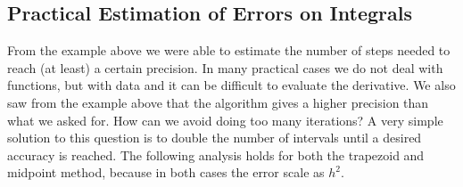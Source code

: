 \documentclass[graybox,sectrefs,envcountresetchap,open=right,final]{svmonodo}
\begin{document}
\subsection{Practical Estimation of Errors on Integrals}
\label{sec:numint:parct}
From the example above we were able to estimate the number of steps needed to reach (at least) a certain precision. 
In many practical cases we do not deal with functions, but with data and it can be difficult to evaluate the derivative. 
We also saw from the example above that the algorithm gives a higher precision than what we asked for. 
How can we avoid doing too many iterations? A very simple solution to this question is to double the number of intervals until 
a desired accuracy is reached. The following analysis holds for both the trapezoid and midpoint method, because in both cases 
the error scale as $h^2$. 
\end{document}
